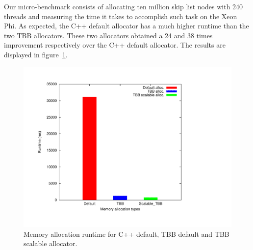 Our micro-benchmark consists of allocating ten million skip list nodes with 240 threads and measuring the time it takes to accomplish such task on the Xeon Phi.
As expected, the C++ default allocator has a much higher runtime than the two TBB allocators. These two allocators obtained a 24 and 38 times improvement respectively over the C++ default allocator. The results are displayed in figure~\ref{fig:mem_alloc}.

\begin{figure}
	\centering
  	\includegraphics[scale=0.3]{../plots/mem_alloc/mem_alloc.pdf}
	\caption{Memory allocation runtime for C++ default, TBB default and TBB scalable allocator.}
	\label{fig:mem_alloc}
\end{figure}
